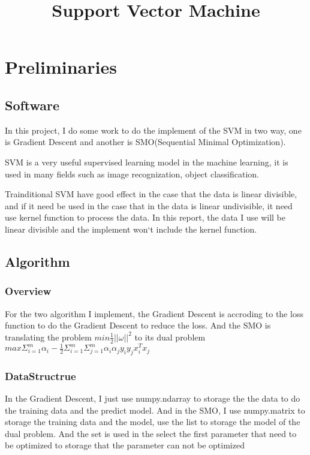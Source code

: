 \documentclass[conference,compsoc]{IEEEtran}
\begin{document}
\title{Support Vector Machine}
\author{
}
\maketitle
\IEEEpeerreviewmaketitle 

\section{Preliminaries}
  \subsection{Software}
	In this project, I do some work to do the implement of the SVM\cite{cortes1995support} in two way, one is Gradient Descent\cite{bottou2010large} and another is SMO(Sequential Minimal Optimization)\cite{platt1998sequential}. 

    SVM is a very useful supervised learning model in the machine learning, it is used in many fields such as image recognization, object classification.

    Trainditional SVM have good effect in the case that the data is linear divisible, and if it need be used in the case that in the data is linear undivisible, it need use kernel function to process the data. In this report, the data I use will be linear divisible and the implement won`t include the kernel function.
  \subsection{Algorithm}
    \subsubsection{Overview}
        For the two algorithm I implement, the Gradient Descent is accroding to the loss function to do the Gradient Descent to reduce the loss.
        And the SMO is translating the problem $min\frac{1}{2}||\omega||^2$ to its dual problem $max\Sigma^{m}_{i=1}\alpha_i - \frac{1}{2} \Sigma^{m}_{i=1} \Sigma^{m}_{j=1}\alpha_i \alpha_j y_i y_j x_{i}^{T} x_j$
    \subsubsection{DataStructrue}
        In the Gradient Descent, I just use numpy.ndarray to storage the the data to do the training data and the predict model.
        And in the SMO, I use numpy.matrix to storage the training data and the model, use the list to storage the model of the dual problem. And the set is used in the select the first parameter that need to be optimized to storage that the parameter can not be optimized
\end{document}
